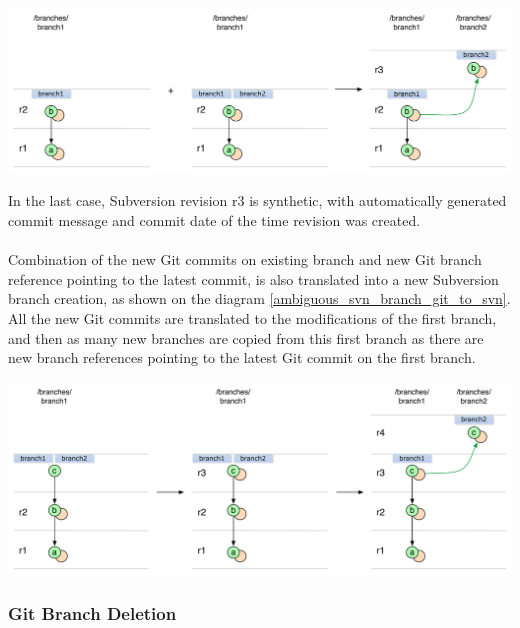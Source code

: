 \begin{center}
\includegraphics[width=\textwidth]{img/diagrams/svn_no_change_branch_creation_git_to_svn.pdf}%
\label{svn_no_change_branch_creation_git_to_svn}%
\end{center}

In the last case, Subversion revision r3 is synthetic, with automatically generated commit message and commit date of the time
revision was created.
\\\\
Combination of the new Git commits on existing branch and new Git branch reference pointing to the latest commit,
is also translated into a new Subversion branch creation, as shown on the diagram \ref{ambiguous_svn_branch_git_to_svn}.
All the new Git commits are translated to the modifications of the first branch, and then as many new branches 
are copied from this first branch as there are new branch references pointing to the latest Git commit on the 
first branch.
\begin{center}
\includegraphics[width=\textwidth]{img/diagrams/ambiguous_svn_branch_git_to_svn.pdf}%
\label{ambiguous_svn_branch_git_to_svn}%
\end{center}

\subsubsection{Git Branch Deletion}

